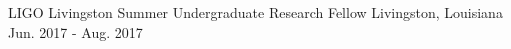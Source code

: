 \begin{cventries}
  \cventry
    {LIGO Livingston} %
    {Summer Undergraduate Research Fellow} %
    {Livingston, Louisiana} %
    {Jun. 2017 - Aug. 2017 } %
    {
    }


\end{cventries}
